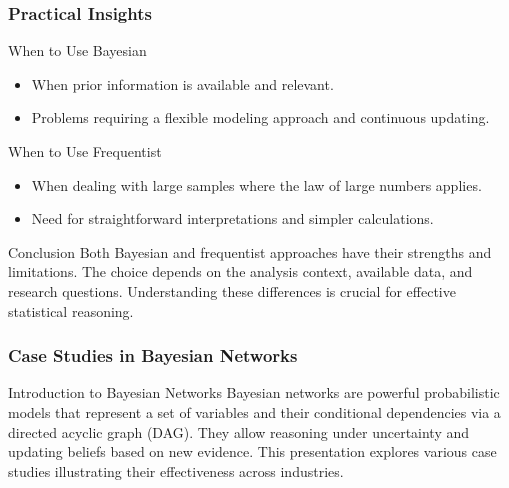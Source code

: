 \documentclass[aspectratio=169]{beamer}
\begin{document}
\begin{frame}[fragile]
    \frametitle{Practical Insights}

    \begin{block}{When to Use Bayesian}
        \begin{itemize}
            \item When prior information is available and relevant.
            \item Problems requiring a flexible modeling approach and continuous updating.
        \end{itemize}
    \end{block}

    \begin{block}{When to Use Frequentist}
        \begin{itemize}
            \item When dealing with large samples where the law of large numbers applies.
            \item Need for straightforward interpretations and simpler calculations.
        \end{itemize}
    \end{block}

    \begin{block}{Conclusion}
        Both Bayesian and frequentist approaches have their strengths and limitations. The choice depends on the analysis context, available data, and research questions. Understanding these differences is crucial for effective statistical reasoning.
    \end{block}
\end{frame}

\begin{frame}[fragile]
    \frametitle{Case Studies in Bayesian Networks}
    \begin{block}{Introduction to Bayesian Networks}
        Bayesian networks are powerful probabilistic models that represent a set of variables and their conditional dependencies via a directed acyclic graph (DAG).
        They allow reasoning under uncertainty and updating beliefs based on new evidence.
        This presentation explores various case studies illustrating their effectiveness across industries.
    \end{block}
\end{frame}
\end{document}
